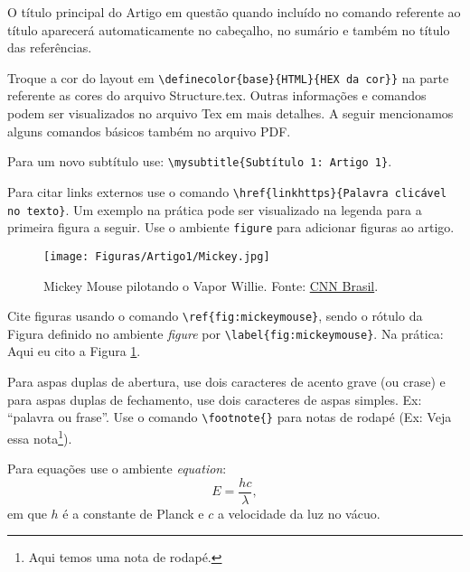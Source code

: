 \begin{multicols}{2} %

O título principal do Artigo em questão quando incluído no comando referente ao título aparecerá automaticamente no cabeçalho, no sumário e também no título das referências.

Troque a cor do layout em \texttt{\textbackslash definecolor\{base\}\{HTML\}\{HEX da cor\}\}} na parte referente as cores do arquivo Structure.tex. Outras informações e comandos podem ser visualizados no arquivo Tex em mais detalhes. A seguir mencionamos alguns comandos básicos também no arquivo PDF. 

Para um novo subtítulo use: \texttt{\textbackslash mysubtitle\{Subtítulo 1: Artigo 1\}}. 
%
%

Para citar links externos use o comando \texttt{\textbackslash href\{linkhttps\}\{Palavra clicável no texto\}}. Um exemplo na prática pode ser visualizado na legenda para a primeira figura a seguir. Use o ambiente \texttt{figure} para adicionar figuras ao artigo. 

\begin{figure}[H]
	\centering
	\texttt{[image: Figuras/Artigo1/Mickey.jpg]}
	\caption{Mickey Mouse pilotando o Vapor Willie. Fonte: \href{https://www.cnnbrasil.com.br/entretenimento/o-mickey-vai-entrar-em-dominio-publico-em-2024-o-que-vai-mudar/}{CNN Brasil}.}
	\label{fig:mickeymouse}
\end{figure}

Cite figuras usando o comando \texttt{\textbackslash ref\{fig:mickeymouse\}}, sendo o rótulo da Figura definido no ambiente \textit{figure} por \texttt{\textbackslash label\{fig:mickeymouse\}}. Na prática: Aqui eu cito a Figura \ref{fig:mickeymouse}.

Para aspas duplas de abertura, use dois caracteres de acento grave (ou crase) e para aspas duplas de fechamento, use dois caracteres de aspas simples. Ex: ``palavra ou frase''. Use o comando \texttt{\textbackslash footnote\{\}} para notas de rodapé (Ex: Veja essa nota\footnote{Aqui temos uma nota de rodapé.}).

Para equações use o ambiente \textit{equation}:
%
\begin{equation}\label{Eq1}
    E = \frac{hc}{\lambda},
\end{equation}
%
em que $h$ é a constante de Planck e $c$ a velocidade da luz no vácuo.


\end{multicols}

